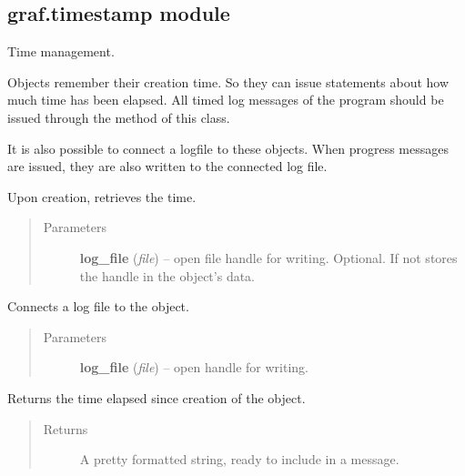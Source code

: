 \documentclass[letterpaper,10pt,english]{sphinxmanual}
\begin{document}
\subsection{graf.timestamp module}
\label{graf/graf:graf-timestamp-module}\label{graf/graf:module-graf.timestamp}

\begin{fulllineitems}
\label{graf/graf:graf.timestamp.Timestamp}
Time management.

Objects remember their creation time. So they can issue statements about how much time has been elapsed.
All timed log messages of the program should be issued through the {\hyperref[graf/graf:graf.timestamp.Timestamp.progress]{}} method of this class.

It is also possible to connect a logfile to these objects.
When progress messages are issued, they are also written to the connected log file.

Upon creation, retrieves the time.
\begin{quote}\begin{description}
\item[{Parameters}] \leavevmode
\textbf{log\_file} (\emph{file}) --
open file handle for writing. Optional. If not  stores the handle in the object's data.

\end{description}\end{quote}

\begin{fulllineitems}
\label{graf/graf:graf.timestamp.Timestamp.connect_log}
Connects a log file to the object.
\begin{quote}\begin{description}
\item[{Parameters}] \leavevmode
\textbf{log\_file} (\emph{file}) --
open handle for writing.

\end{description}\end{quote}

\end{fulllineitems}


\begin{fulllineitems}
\label{graf/graf:graf.timestamp.Timestamp.elapsed}
Returns the time elapsed since creation of the {\hyperref[graf/graf:graf.timestamp.Timestamp]{}} object.
\begin{quote}\begin{description}
\item[{Returns}] \leavevmode
A pretty formatted string, ready to include in a message.


\end{description}
\end{quote}
\end{fulllineitems}
\end{fulllineitems}
\end{document}
